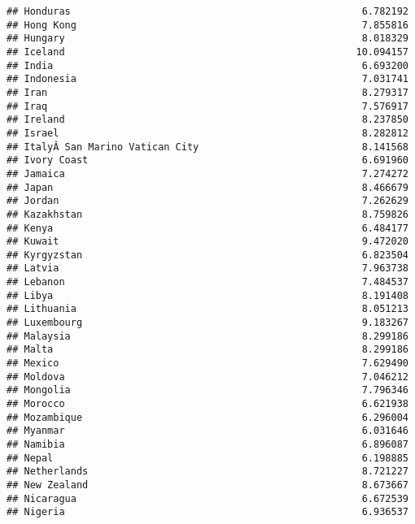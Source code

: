 \documentclass[
]{article}
\begin{document}
\begin{verbatim}
## Honduras                                                  6.782192
## Hong Kong                                                 7.855816
## Hungary                                                   8.018329
## Iceland                                                  10.094157
## India                                                     6.693200
## Indonesia                                                 7.031741
## Iran                                                      8.279317
## Iraq                                                      7.576917
## Ireland                                                   8.237850
## Israel                                                    8.282812
## ItalyÂ San Marino Vatican City                            8.141568
## Ivory Coast                                               6.691960
## Jamaica                                                   7.274272
## Japan                                                     8.466679
## Jordan                                                    7.262629
## Kazakhstan                                                8.759826
## Kenya                                                     6.484177
## Kuwait                                                    9.472020
## Kyrgyzstan                                                6.823504
## Latvia                                                    7.963738
## Lebanon                                                   7.484537
## Libya                                                     8.191408
## Lithuania                                                 8.051213
## Luxembourg                                                9.183267
## Malaysia                                                  8.299186
## Malta                                                     8.299186
## Mexico                                                    7.629490
## Moldova                                                   7.046212
## Mongolia                                                  7.796346
## Morocco                                                   6.621938
## Mozambique                                                6.296004
## Myanmar                                                   6.031646
## Namibia                                                   6.896087
## Nepal                                                     6.198885
## Netherlands                                               8.721227
## New Zealand                                               8.673667
## Nicaragua                                                 6.672539
## Nigeria                                                   6.936537

\end{verbatim}
\end{document}
